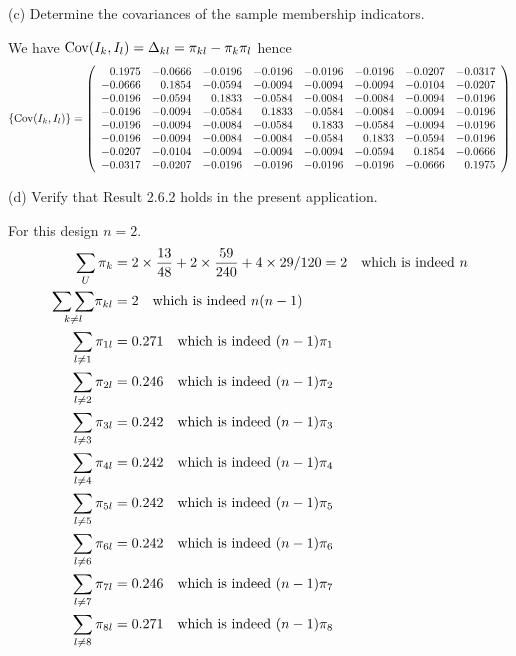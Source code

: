 \documentclass[12pt]{article}
\begin{document}

(c) Determine the covariances of the sample membership indicators.

We have $\mathop{\rm Cov}(I_k,I_l)=\Delta_{kl}
=\pi_{kl}-\pi_k\pi_l$ hence
\[
\{\mathop{\rm Cov}(I_k,I_l)\}=
\left(
\begin{array}{rrrrrrrr}
 0.1975 &  -0.0666 &  -0.0196 &  -0.0196 &  -0.0196 &  -0.0196 &  -0.0207 &  -0.0317\\
 -0.0666 &  0.1854 &  -0.0594 &  -0.0094 &  -0.0094 &  -0.0094 &  -0.0104 &  -0.0207\\
 -0.0196 &  -0.0594 &  0.1833 &  -0.0584 &  -0.0084 &  -0.0084 &  -0.0094 &  -0.0196\\
 -0.0196 &  -0.0094 &  -0.0584 &  0.1833 &  -0.0584 &  -0.0084 &  -0.0094 &  -0.0196\\
 -0.0196 &  -0.0094 &  -0.0084 &  -0.0584 &  0.1833 &  -0.0584 &  -0.0094 &  -0.0196\\
 -0.0196 &  -0.0094 &  -0.0084 &  -0.0084 &  -0.0584 &  0.1833 &  -0.0594 &  -0.0196\\
 -0.0207 &  -0.0104 &  -0.0094 &  -0.0094 &  -0.0094 &  -0.0594 &  0.1854 &  -0.0666\\
 -0.0317 &  -0.0207 &  -0.0196 &  -0.0196 &  -0.0196 &  -0.0196 &  -0.0666 &  0.1975\\
\end{array}
\right)
\]

(d) Verify that Result 2.6.2 holds in the present application.

For this design $n=2$.
\begin{align*}
\sum_U\pi_k&=2\times{13\over48}+2\times{59\over240}
+4\times{29/120}=2\quad\hbox{which is indeed $n$}
\\
\underset{k\ne l}{\sum\sum}\pi_{kl}&=2\quad
\hbox{which is indeed $n(n-1)$}
\\
\sum_{l\ne1}\pi_{1l}&=0.271\quad\hbox{which is indeed $(n-1)\pi_1$}\\
\sum_{l\ne2}\pi_{2l}&=0.246\quad\hbox{which is indeed $(n-1)\pi_2$}\\
\sum_{l\ne3}\pi_{3l}&=0.242\quad\hbox{which is indeed $(n-1)\pi_3$}\\
\sum_{l\ne4}\pi_{4l}&=0.242\quad\hbox{which is indeed $(n-1)\pi_4$}\\
\sum_{l\ne5}\pi_{5l}&=0.242\quad\hbox{which is indeed $(n-1)\pi_5$}\\
\sum_{l\ne6}\pi_{6l}&=0.242\quad\hbox{which is indeed $(n-1)\pi_6$}\\
\sum_{l\ne7}\pi_{7l}&=0.246\quad\hbox{which is indeed $(n-1)\pi_7$}\\
\sum_{l\ne8}\pi_{8l}&=0.271\quad\hbox{which is indeed $(n-1)\pi_8$}
\end{align*}
\end{document}
